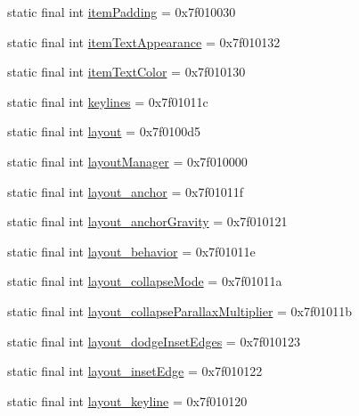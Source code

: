 \begin{CompactItemize}
\item 
static final int \hyperlink{classandroid_1_1support_1_1mediacompat_1_1_r_1_1attr_8b509a08e515b35bc10e4e5297d684dd}{itemPadding} = 0x7f010030
\item 
static final int \hyperlink{classandroid_1_1support_1_1mediacompat_1_1_r_1_1attr_4327620de603afab7ad3cb144be40d11}{itemTextAppearance} = 0x7f010132
\item 
static final int \hyperlink{classandroid_1_1support_1_1mediacompat_1_1_r_1_1attr_b5f33a317ef130d961eba14ac531b970}{itemTextColor} = 0x7f010130
\item 
static final int \hyperlink{classandroid_1_1support_1_1mediacompat_1_1_r_1_1attr_7be338299289c4a128e4fc77d1709994}{keylines} = 0x7f01011c
\item 
static final int \hyperlink{classandroid_1_1support_1_1mediacompat_1_1_r_1_1attr_ce05491fbaa7c431126d9f5477fb5d83}{layout} = 0x7f0100d5
\item 
static final int \hyperlink{classandroid_1_1support_1_1mediacompat_1_1_r_1_1attr_9c1de1528a93f4b727706b93b27c436a}{layoutManager} = 0x7f010000
\item 
static final int \hyperlink{classandroid_1_1support_1_1mediacompat_1_1_r_1_1attr_ef3ae9b882e6dc44adc34deda02d8d3d}{layout\_\-anchor} = 0x7f01011f
\item 
static final int \hyperlink{classandroid_1_1support_1_1mediacompat_1_1_r_1_1attr_961e0440439f856f1539cbd62e654dc9}{layout\_\-anchorGravity} = 0x7f010121
\item 
static final int \hyperlink{classandroid_1_1support_1_1mediacompat_1_1_r_1_1attr_c977eeccbd1dc3b001895758e9e6bec8}{layout\_\-behavior} = 0x7f01011e
\item 
static final int \hyperlink{classandroid_1_1support_1_1mediacompat_1_1_r_1_1attr_d38602f838c284d0b4e90f9d35408094}{layout\_\-collapseMode} = 0x7f01011a
\item 
static final int \hyperlink{classandroid_1_1support_1_1mediacompat_1_1_r_1_1attr_1a575f4e3e5b8ad2916413f3c403df96}{layout\_\-collapseParallaxMultiplier} = 0x7f01011b
\item 
static final int \hyperlink{classandroid_1_1support_1_1mediacompat_1_1_r_1_1attr_3542cefb8ae1c01d3a8ababc5ed31647}{layout\_\-dodgeInsetEdges} = 0x7f010123
\item 
static final int \hyperlink{classandroid_1_1support_1_1mediacompat_1_1_r_1_1attr_d576ddb515f2fdde8e1649093604b662}{layout\_\-insetEdge} = 0x7f010122
\item 
static final int \hyperlink{classandroid_1_1support_1_1mediacompat_1_1_r_1_1attr_57d647f1854f4312498d0df8400663a7}{layout\_\-keyline} = 0x7f010120

\end{CompactItemize}
